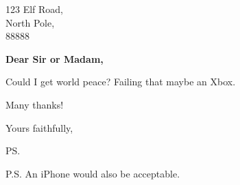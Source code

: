 \documentclass[10pt]{letter} %
\begin{document}

\begin{letter}{
123 Elf Road,\\ 
North Pole,\\ 
88888
} %


\opening{\textbf{Dear Sir or Madam,}}



Could I get world peace? Failing that maybe an Xbox.

Many thanks!



\vspace{2\parskip} %

\closing{
Yours faithfully,
}

\ps{

P.S. An iPhone would also be acceptable.
} %



\end{letter}
 
\end{document}
